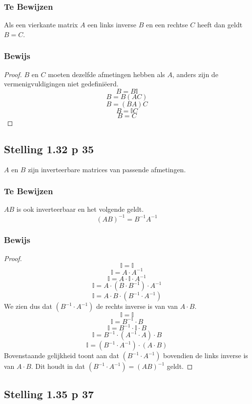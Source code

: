 \documentclass[lineaire_algebra_oplossingen.tex]{subfiles}
\begin{document}
\subsubsection*{Te Bewijzen}
Als een vierkante matrix $A$ een links inverse $B$ en een rechtse $C$ heeft dan geldt $B=C$.

\subsubsection*{Bewijs}
\begin{proof}
$B$ en $C$ moeten dezelfde afmetingen hebben als $A$, anders zijn de vermenigvuldigingen niet gedefini\"eerd.
\[B = B\mathbb{I}\]
\[B = B (AC)\]
\[B = (BA)C\]
\[B = \mathbb{I}C\]
\[B = C\]
\end{proof}


\subsection{Stelling 1.32 p 35}
\label{1.32}
$A$ en $B$ zijn inverteerbare matrices van passende afmetingen.
\subsubsection*{Te Bewijzen}
$AB$ is ook inverteerbaar en het volgende geldt.
\[
(AB)^{-1} = B^{-1}A^{-1}
\]

\subsubsection*{Bewijs}
\begin{proof}
$$\mathbb{I} = \mathbb{I}$$
$$\mathbb{I} = A\cdot A^{-1}$$
$$\mathbb{I} = A\cdot \mathbb{I} \cdot A^{-1}$$
$$\mathbb{I} = A\cdot (B\cdot B^{-1}) \cdot A^{-1}$$
$$\mathbb{I} = A\cdot B\cdot (B^{-1} \cdot A^{-1})$$
We zien dus dat $(B^{-1} \cdot A^{-1})$ de rechts inverse is van van $A \cdot B$. 
$$\mathbb{I} = \mathbb{I}$$
$$\mathbb{I} = B^{-1}\cdot B$$
$$\mathbb{I} = B^{-1}\cdot \mathbb{I}\cdot B$$
$$\mathbb{I} = B^{-1}\cdot (A^{-1}\cdot A) \cdot B$$
$$\mathbb{I} = (B^{-1} \cdot  A^{-1})\cdot (A\cdot B)$$
Bovenstaande gelijkheid toont aan dat $(B^{-1} \cdot A^{-1})$ bovendien de links inverse is van $A \cdot B$. 
Dit houdt in dat $(B^{-1} \cdot A^{-1}) = (AB)^{-1}$ geldt.
\end{proof}


\subsection{Stelling 1.35 p 37}
\label{1.35}
\end{document}
